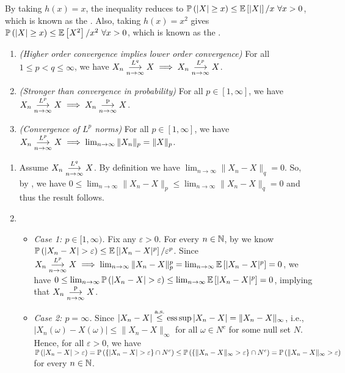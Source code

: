 \begin{enumerate}
\begin{note}
By taking \(h(x)=x\), the inequality reduces to \(\mathbb{P}\left(|X|\ge
x\right)\le\mathbb{E}\left[|X|\right]/x~\forall x>0\), which is known as the . Also,
taking \(h(x)=x^2\) gives \(\mathbb{P}\left(|X|\ge x\right)\le\mathbb{E}\left[X^2\right]/x^2~\forall x>0\), which is known
as the .
\end{note}
\begin{proposition}
\label{prp:conv-lp-prop}
\hfill
\begin{enumerate}
\item \emph{(Higher order convergence implies lower order convergence)} For all \(1\le
p<q\le \infty\), we have \(X_n\underset{n\to\infty}{\overset{L^q}{\longrightarrow}}X\implies X_n\underset{n\to\infty}{\overset{L^p}{\longrightarrow}} X\).
\item \emph{(Stronger than convergence in probability)} For all \(p\in
[1,\infty]\), we have \(X_n\underset{n\to\infty}{\overset{L^p}{\longrightarrow}} X\implies X_n\underset{n\to\infty}{\overset{\text{p}}{\longrightarrow}} X\).
\item \emph{(Convergence of \(L^p\) norms)} For all \(p\in [1,\infty]\), we
have \(X_n\underset{n\to\infty}{\overset{L^p}{\longrightarrow}} X\implies \lim_{n\to\infty}\|X_n\|_{p}=\|X\|_{p}\).
\end{enumerate}
\end{proposition}
\begin{pf}
\begin{enumerate}
\item Assume \(X_n\underset{n\to\infty}{\overset{L^q}{\longrightarrow}}X\). By definition we have
\(\lim_{n\to\infty}\|X_n-X\|_{q}=0\). So, by ,
we have \(0\le
\lim_{n\to\infty}\|X_n-X\|_{p}\le\lim_{n\to\infty}\|X_n-X\|_{q}=0\) and thus
the result follows.
\item
\begin{itemize}
\item \emph{Case 1: \(p\in [1,\infty)\).} Fix any \(\varepsilon>0\). For every
\(n\in\mathbb{N}\), by  we know
\(\prob{|X_n-X|>\varepsilon}\le\expv{|X_n-X|^{p}}/\varepsilon^{p}\). Since
\(X_n\underset{n\to\infty}{\overset{L^p}{\longrightarrow}} X\implies
\lim_{n\to\infty}\|X_n-X\|_{p}^p=\lim_{n\to\infty}\mathbb{E}\left[|X_n-X|^{p}\right]=0\), we have
\(0\le\lim_{n\to\infty}\prob{|X_n-X|>\varepsilon}\le\lim_{n\to\infty}\expv{|X_n-X|^{p}}=0
\), implying that \(X_n\underset{n\to\infty}{\overset{\text{p}}{\longrightarrow}} X\).
\item \emph{Case 2: \(p=\infty\).} Since
\(|X_n-X|\overset{\text{a.s.}}{\le}\operatorname*{ess\,sup}|X_n-X|=\|X_n-X\|_{\infty}\), i.e.,
\(|X_n(\omega)-X(\omega)|\le\|X_n-X\|_{\infty}\) for all \(\omega\in N^c\) for
some null set \(N\).  Hence, for all \(\varepsilon>0\), we have
\(\prob{|X_n-X|>\varepsilon}=
\prob{\{|X_n-X| >\varepsilon\}\cap N^c}
\le\prob{\{\|X_n-X\|_{\infty}>\varepsilon\}\cap N^c}
=\prob{\|X_n-X\|_{\infty}>\varepsilon}\)
for every \(n\in\mathbb{N}\).


\end{itemize}
\end{enumerate}
\end{pf}
\end{enumerate}
